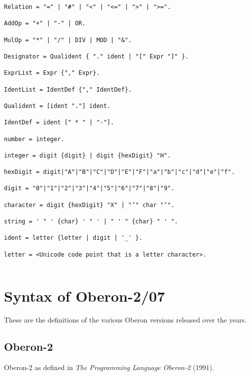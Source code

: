 \documentclass[12pt]{article}
\begin{document}
{\begin{lstlisting}[style=EBNF]
Relation = "=" | "#" | "<" | "<=" | ">" | ">=".

AddOp = "+" | "-" | OR.

MulOp = "*" | "/" | DIV | MOD | "&".

Designator = Qualident { "." ident | "[" Expr "]" }. 

ExprList = Expr {"," Expr}.

IdentList = IdentDef {"," IdentDef}.

Qualident = [ident "."] ident.

IdentDef = ident [" * " | "-"].

number = integer.

integer = digit {digit} | digit {hexDigit} "H".

hexDigit = digit|"A"|"B"|"C"|"D"|"E"|"F"|"a"|"b"|"c"|"d"|"e"|"f".

digit = "0"|"1"|"2"|"3"|"4"|"5"|"6"|"7"|"8"|"9".

character = digit {hexDigit} "X" | "’" char "’".

string = ' " ' {char} ' " ' | " ' " {char} " ' ".

ident = letter {letter | digit | '_' }.

letter = <Unicode code point that is a letter character>.
 
\end{lstlisting}}

\section{Syntax of Oberon-2/07}

These are the definitions of the various Oberon versions released over the years.

\subsection{Oberon-2}

Oberon-2 as defined in {\em The Programming Language Oberon-2} (1991).
\end{document}
